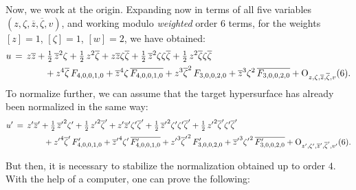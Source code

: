 \documentclass[12pt,twoside,leqno,openany]{amsart}
\begin{document}
Now, we work at the origin.
Expanding now in terms of all five variables
$(z, \zeta, \overline{z}, \overline{\zeta}, v)$, 
and working modulo {\em weighted} order $6$ terms,
for the weights $[z] = 1$, $[\zeta] = 1$, $[w] = 2$,
we have obtained:
\[
\aligned
u
&
\,=\,
z\overline{z}
+
\tfrac{1}{2}\,\overline{z}^2\zeta
+
\tfrac{1}{2}\,z^2\overline{\zeta}
+
z\overline{z}\zeta\overline{\zeta}
+
\tfrac{1}{2}\,\overline{z}^2\zeta\zeta\overline{\zeta}
+
\tfrac{1}{2}\,z^2\overline{\zeta}\zeta\overline{\zeta}
\\
&
\ \ \ \ \ \ \ \ \ \ \
+
z^4\overline{\zeta}\,F_{4,0,0,1,0}
+
\overline{z}^4\zeta\,\overline{F_{4,0,0,1,0}}
+
z^3\overline{\zeta}^2\,F_{3,0,0,2,0}
+
\overline{z}^3\zeta^2\,\overline{F_{3,0,0,2,0}}
+
{\rm O}_{z,\zeta,\overline{z},\overline{\zeta},v}(6).
\endaligned
\]
To normalize further, we can assume that the target hypersurface
has already been normalized in the same way:
\[
\aligned
u'
&
\,=\,
z'\overline{z}'
+
\tfrac{1}{2}\,{\overline{z}'}^2\zeta'
+
\tfrac{1}{2}\,{z'}^2\overline{\zeta}'
+
z'\overline{z}'\zeta'\overline{\zeta}'
+
\tfrac{1}{2}\,{\overline{z}'}^2\zeta'\zeta'\overline{\zeta}'
+
\tfrac{1}{2}\,{z'}^2\overline{\zeta}'\zeta'\overline{\zeta}'
\\
&
\ \ \ \ \ \ \ \ \ \ \
+
{z'}^4\overline{\zeta}'\,F_{4,0,0,1,0}'
+
{\overline{z}'}^4\zeta'\,\overline{F_{4,0,0,1,0}'}
+
{z'}^3{\overline{\zeta}'}^2\,F_{3,0,0,2,0}'
+
{\overline{z}'}^3{\zeta'}^2\,\overline{F_{3,0,0,2,0}'}
+
{\rm O}_{z',\zeta',\overline{z}',\overline{\zeta}',v'}(6).
\endaligned
\]

But then, it is necessary to stabilize the normalization obtained
up to order $4$. With the help of a computer,
one can prove the following:
\end{document}
